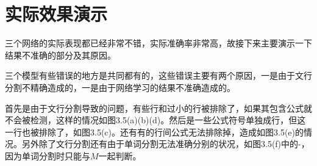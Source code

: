 \section{实际效果演示}
\noindent

三个网络的实际表现都已经非常不错，实际准确率非常高，故接下来主要演示一下结果不准确的部分及其原因。

三个模型有些错误的地方是共同都有的，这些错误主要有两个原因，一是由于文行分割不精确造成的，一是由于网络学习的结果不准确造成的。

首先是由于文行分割导致的问题，有些行和过小的行被排除了，如果其包含公式就不会被检测，这样的情况如图3.5(a)(b)(d)。然后是一些公式符号单独成行，但这一行也被排除了，如图3.5(c)。还有有的行间公式无法排除掉，造成如图3.5(e)的情况。另外除了文行分割还有由于单词分割无法准确分别的状况，如图3.5(f)中的-，因为单词分割时只能与$M$一起判断。

